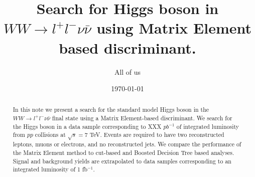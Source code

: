 \documentclass{cmspaper}
\begin{document}


\title{Search for Higgs boson in $WW \rightarrow l^{+}l^{-}\nu\bar{\nu}$ using Matrix Element based discriminant.}



\author{All of us}



\date{\today}

\begin{abstract}
In this note we present a search for the standard model Higgs boson in the $WW \rightarrow l^{+}l^{-}\nu\bar{\nu}$ final state 
using a Matrix Element-based discriminant. We search for the Higgs boson in a data sample corresponding to XXX $pb^{-1}$ 
of integrated luminosity from $pp$ collisions at $\sqrt{s}=7$ TeV.
Events are required to have two reconstructed leptons, muons or electrons, and no reconstructed jets.
We compare the performance of the Matrix Element method to cut-based and Boosted Decision Tree based analyses. 
Signal and background yields are extrapolated to data samples corresponding to an integrated luminosity of 1 fb$^{-1}$. 
\end{abstract}


\maketitle
\end{document}
